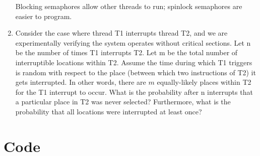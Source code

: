 \documentclass[12pt]{article}
\begin{document}
\begin{enumerate}[1)]
  Blocking semaphores allow other threads to run; spinlock semaphores
  are easier to program.
\item Consider the case where thread T1 interrupts thread T2, and we
  are experimentally verifying the system operates without critical
  sections. Let n be the number of times T1 interrupts T2. Let m be
  the total number of interruptible locations within T2. Assume the
  time during which T1 triggers is random with respect to the place
  (between which two instructions of T2) it gets interrupted. In other
  words, there are $m$ equally-likely places within T2 for the T1
  interrupt to occur. What is the probability after n interrupts that
  a particular place in T2 was never selected? Furthermore, what is
  the probability that all locations were interrupted at least once?
\end{enumerate}

\section{Code}





\end{document}
